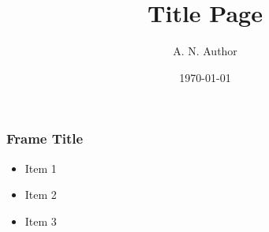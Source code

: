 \documentclass[hyperref=hidelinks]{beamer}
\title{Title Page}
\author{A. N. Author}
\date{\today}
\begin{document}
\begin{frame}
    \titlepage
\end{frame}

\begin{frame}
  \frametitle{Frame Title}
  \begin{itemize}
  \item Item 1
  \item Item 2
  \item Item 3
  \end{itemize}
\end{frame}
\end{document}
